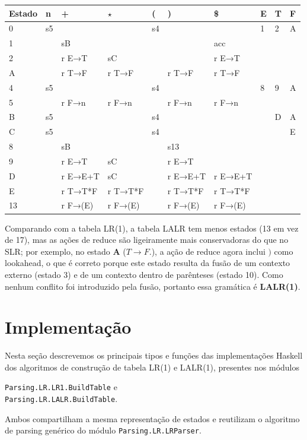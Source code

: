 \begin{table}[H]
\begin{tabular}{@{}llllllllll@{}}
\toprule
Estado & n & + & $\star$ & ( & ) & \$ & E & T & F \\
\midrule
0 & s5 & & & s4 & & & 1 & 2 & A \\
1 & & sB & & & & acc & & & \\
2 & & r E→T & sC & & & r E→T & & & \\
A & & r T→F & r T→F & & r T→F & r T→F & & & \\
4 & s5 & & & s4 & & & 8 & 9 & A \\
5 & & r F→n & r F→n & & r F→n & r F→n & & & \\
B & s5 & & & s4 & & & & D & A \\
C & s5 & & & s4 & & & & & E \\
8 & & sB & & & s13 & & & & \\
9 & & r E→T & sC & & r E→T & & & & \\
D & & r E→E+T & sC & & r E→E+T & r E→E+T & & & \\
E & & r T→T*F & r T→T*F & & r T→T*F & r T→T*F & & & \\
13 & & r F→(E) & r F→(E) & & r F→(E) & r F→(E) & & & \\
\bottomrule
\end{tabular}
\centering
\end{table}

Comparando com a tabela LR(1), a tabela LALR tem menos estados (13 em
vez de 17), mas as ações de reduce são ligeiramente mais
conservadoras do que no SLR; por exemplo, no estado \textbf{A}
(\(T \to F.\)), a ação de reduce agora inclui \()\) como lookahead, o
que é correto porque este estado resulta da fusão de um contexto
externo (estado 3) e de um contexto dentro de parênteses (estado 10).
Como nenhum conflito foi introduzido pela fusão, portanto essa
gramática é \textbf{LALR(1)}.

\section{Implementação}

Nesta seção descrevemos os principais tipos e funções das
implementações Haskell dos algoritmos de construção de tabela LR(1) e
LALR(1), presentes nos módulos
\begin{flushleft}
\verb|Parsing.LR.LR1.BuildTable| e\\
\verb|Parsing.LR.LALR.BuildTable|.
\end{flushleft}
Ambos compartilham a mesma representação de estados e reutilizam o
algoritmo de parsing genérico do módulo
\verb|Parsing.LR.LRParser|.


